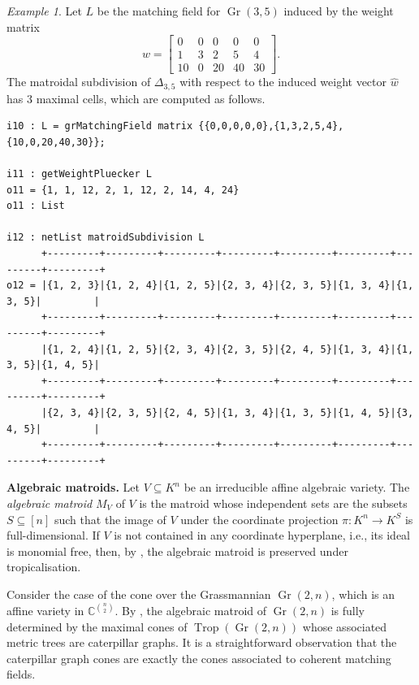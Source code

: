 \documentclass[11pt]{article}
\newcommand{\CC}{\mathbb C}
\DeclareMathOperator{\Gr}{Gr}
\DeclareMathOperator{\Trop}{Trop}
\theoremstyle{plain}
\theoremstyle{definition}
\theoremstyle{remark}
\newtheorem{example}[theorem]{Example}
\begin{document}
\begin{example}
    Let $L$ be the matching field for $\Gr(3,5)$ induced by the weight matrix
    \[
    w = 
    \begin{bmatrix}
        0 & 0 & 0 & 0 & 0 \\
        1 & 3 & 2 & 5 & 4 \\
        10 & 0 & 20 & 40 & 30 
    \end{bmatrix}.
    \]
    The matroidal subdivision of $\Delta_{3,5}$ with respect to the induced weight vector $\widehat w$ has $3$ maximal cells, which are computed as follows.
    
\begin{lstlisting}[caption = {Matroidal subdivision of the hypersimplex $\Delta_{3,5}$}]
i10 : L = grMatchingField matrix {{0,0,0,0,0},{1,3,2,5,4},{10,0,20,40,30}};

i11 : getWeightPluecker L
o11 = {1, 1, 12, 2, 1, 12, 2, 14, 4, 24}
o11 : List

i12 : netList matroidSubdivision L
      +---------+---------+---------+---------+---------+---------+---------+---------+
o12 = |{1, 2, 3}|{1, 2, 4}|{1, 2, 5}|{2, 3, 4}|{2, 3, 5}|{1, 3, 4}|{1, 3, 5}|         |
      +---------+---------+---------+---------+---------+---------+---------+---------+
      |{1, 2, 4}|{1, 2, 5}|{2, 3, 4}|{2, 3, 5}|{2, 4, 5}|{1, 3, 4}|{1, 3, 5}|{1, 4, 5}|
      +---------+---------+---------+---------+---------+---------+---------+---------+
      |{2, 3, 4}|{2, 3, 5}|{2, 4, 5}|{1, 3, 4}|{1, 3, 5}|{1, 4, 5}|{3, 4, 5}|         |
      +---------+---------+---------+---------+---------+---------+---------+---------+
\end{lstlisting}


\end{example}

\medskip

\noindent \textbf{Algebraic matroids.} Let $V \subseteq K^n$ be an irreducible affine algebraic variety. The \textit{algebraic matroid} $M_V$ of $V$ is the matroid whose independent sets are the subsets $S \subseteq [n]$ such that the image of $V$ under the coordinate projection $\pi : K^n \rightarrow K^S$ is full-dimensional. If $V$ is not contained in any coordinate hyperplane, i.e., its ideal is monomial free, then, by \cite{yu2017algebraic}, the algebraic matroid is preserved under tropicalisation.

Consider the case of the cone over the Grassmannian $\Gr(2, n)$, which is an affine variety in $\CC^{\binom n2}$. By \cite{bernstein2017completion}, the algebraic matroid of $\Gr(2,n)$ is fully determined by the maximal cones of $\Trop(\Gr(2,n))$ whose associated metric trees \cite{speyer2004tropical} are caterpillar graphs. It is a straightforward observation that the caterpillar graph cones are exactly the cones associated to coherent matching fields.
\end{document}
